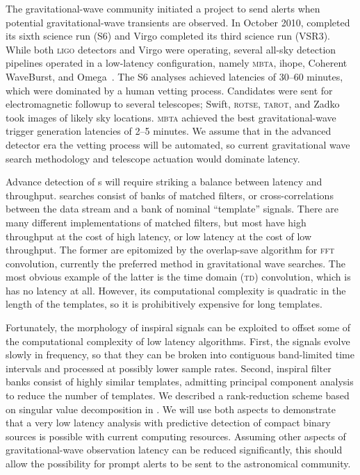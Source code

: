  The gravitational-wave community
initiated a project to send alerts when potential gravitational-wave transients
are observed.  In October 2010, \LIGO{} completed its sixth science run
(S6) and Virgo completed its third science run (VSR3).  While both
\textsc{ligo} detectors and Virgo were operating, several all-sky detection
pipelines operated in a low-latency configuration, namely \textsc{mbta}, ihope,
Coherent WaveBurst, and Omega~\cite{HugheyGWPAW2011, S6lowlatency}.
 The S6 analyses
achieved latencies of 30--60 minutes, which were dominated by a human vetting
process. Candidates were sent for electromagnetic followup to several
telescopes; Swift, \textsc{rotse}, \textsc{tarot}, and Zadko~\cite{kanner2008,
HugheyGWPAW2011} took images of likely sky locations.  \textsc{mbta} achieved
the best gravitational-wave trigger generation latencies of 2--5 minutes.  We
assume that in the advanced detector era the vetting process will be automated,
so current gravitational wave search methodology and telescope actuation would
dominate latency.

Advance detection of \CBC{}s will require striking a balance between latency
and throughput.  \CBC{} searches consist of banks of matched filters, or
cross-correlations between the data stream and a bank of nominal ``template''
signals.  There are many different implementations of matched filters, but most
have high throughput at the cost of high latency, or low latency at the cost of
low throughput.  The former are epitomized by the overlap-save algorithm for
\textsc{fft} convolution, currently the preferred method in gravitational wave
searches.  The most obvious example of the latter is the time domain
(\textsc{td}) convolution, which is has no latency at all.  However, its
computational complexity is quadratic in the length of the templates, so it is
prohibitively expensive for long templates.

Fortunately, the morphology of inspiral signals can be exploited to offset some
of the computational complexity of low latency algorithms.  First, the signals
evolve slowly in frequency, so that they can be broken into contiguous
band-limited time intervals and processed at possibly lower sample rates.
Second, inspiral filter banks consist of highly similar templates, admitting
principal component analysis to reduce the number of templates.  We described a
rank-reduction scheme based on singular value decomposition in
\cite{Cannon:2010p10398}.  We will use both aspects to demonstrate that a very
low latency analysis with predictive detection of compact binary sources is
possible with current computing resources.  Assuming other aspects of
gravitational-wave observation latency can be reduced significantly, this
should allow the possibility for prompt alerts to be sent to the astronomical
community.


